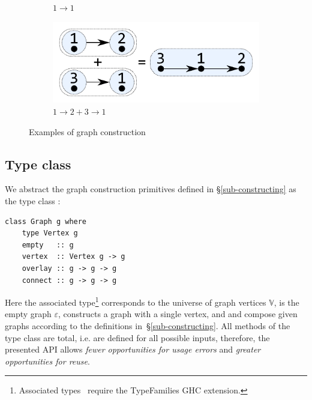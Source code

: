 \begin{figure}
\begin{subfigure}[b]{0.15\linewidth}
\vspace{2.4mm}
\caption{$1 \rightarrow 1$}
\end{subfigure}
\hspace{12mm}
\begin{subfigure}[b]{0.2\linewidth}
\centerline{\includegraphics[scale=0.27]{fig/ex-e.pdf}}
\vspace{-1mm}
\caption{$1 \rightarrow 2 + 3 \rightarrow 1$}
\end{subfigure}
\vspace{-1mm}
\caption{Examples of graph construction\label{fig-construction}}
\vspace{-3mm}
\end{figure}

\vspace{-1mm}
\subsection{Type class}\label{sub-class}

We abstract the graph construction primitives defined in \S\ref{sub-constructing}
as the type class :

\begin{verbatim}
class Graph g where
    type Vertex g
    empty   :: g
    vertex  :: Vertex g -> g
    overlay :: g -> g -> g
    connect :: g -> g -> g
\end{verbatim}

\noindent
Here the associated type\footnote{Associated
types~\cite{2005_associated_type_chakravarty} require the \textsf{TypeFamilies}
GHC extension.}  corresponds to the universe of graph
vertices $\mathbb{V}$,  is the empty graph
$\varepsilon$,  constructs a graph with a single vertex,
and  and  compose given graphs according to
the definitions in~\S\ref{sub-constructing}. All methods of the type class
are total, i.e. are defined for all possible inputs, therefore,
the presented API allows \emph{fewer opportunities for usage errors}
and \emph{greater opportunities for reuse}.


